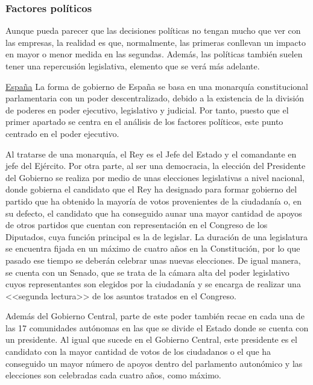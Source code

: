 \subsubsection{Factores políticos}
Aunque pueda parecer que las decisiones políticas no tengan mucho que ver con las empresas, la realidad es que, normalmente, las primeras conllevan un impacto en mayor o menor medida en las segundas. Además, las políticas también suelen tener una repercusión legislativa, elemento que se verá más adelante.

\clearpage

\noindent\underline{España}\newline
\indent La forma de gobierno de España \cite{santandertrade} se basa en una monarquía constitucional parlamentaria con un poder descentralizado, debido a la existencia de la división de poderes en poder ejecutivo, legislativo y judicial. Por tanto, puesto que el primer apartado se centra en el análisis de los factores políticos, este punto centrado en el poder ejecutivo.

Al tratarse de una monarquía, el Rey es el Jefe del Estado y el comandante en jefe del Ejército. Por otra parte, al ser una democracia, la elección del Presidente del Gobierno se realiza por medio de unas elecciones legislativas a nivel nacional, donde gobierna el candidato que el Rey ha designado para formar gobierno del partido que ha obtenido la mayoría de votos provenientes de la ciudadanía o, en su defecto, el candidato que ha conseguido aunar una mayor cantidad de apoyos de otros partidos que cuentan con representación en el Congreso de los Diputados, cuya función principal es la de legislar. La duración de una legislatura se encuentra fijada en un máximo de cuatro años en la Constitución, por lo que pasado ese tiempo se deberán celebrar unas nuevas elecciones. De igual manera, se cuenta con un Senado, que se trata de la cámara alta del poder legislativo cuyos representantes son elegidos por la ciudadanía y se encarga de realizar una <<segunda lectura>> de los asuntos tratados en el Congreso.

Además del Gobierno Central, parte de este poder también recae en cada una de las 17 comunidades autónomas en las que se divide el Estado donde se cuenta con un presidente. Al igual que sucede en el Gobierno Central, este presidente es el candidato con la mayor cantidad de votos de los ciudadanos o el que ha conseguido un mayor número de apoyos dentro del parlamento autonómico y las elecciones son celebradas cada cuatro años, como máximo.

